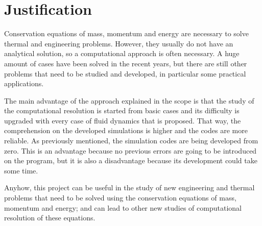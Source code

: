 
\section{Justification}
Conservation equations of mass, momentum and energy are necessary to solve thermal and engineering problems. However, they usually do not have an analytical solution, so a computational approach is often necessary. A huge amount of cases have been solved in the recent years, but there are still other problems that need to be studied and developed, in particular some practical applications.

The main advantage of the approach explained in the scope is that the study of the computational resolution is started from basic cases and its difficulty is upgraded with every case of fluid dynamics that is proposed. That way, the comprehension on the developed simulations is higher and the codes are more reliable. As previously mentioned, the simulation codes are being developed from zero. This is an advantage because no previous errors are going to be introduced on the program, but it is also a disadvantage because its development could take some time.

Anyhow, this project can be useful in the study of new engineering and thermal problems that need to be solved using the conservation equations of mass, momentum and energy; and can lead to other new studies of computational resolution of these equations.

